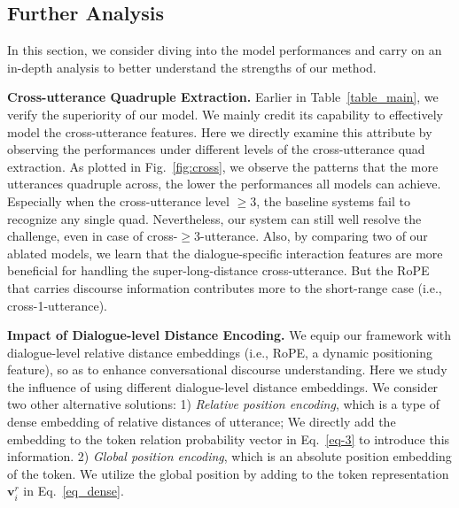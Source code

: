 \documentclass[11pt]{article}
\begin{document}
\vspace{-1mm}
\subsection{Further Analysis}

\vspace{-1mm}
In this section, we consider diving into the model performances and carry on an in-depth analysis to better understand the strengths of our method.

\vspace{2pt}
\noindent\textbf{Cross-utterance Quadruple Extraction.}
Earlier in Table~\ref{table_main}, we verify the superiority of our model.
We mainly credit its capability to effectively model the cross-utterance features.
Here we directly examine this attribute by observing the performances under different levels of the cross-utterance quad extraction.
As plotted in Fig.~\ref{fig:cross}, we observe the patterns that the more utterances quadruple across, the lower the performances all models can achieve.
Especially when the cross-utterance level $\ge$3, the baseline systems fail to recognize any single quad.
Nevertheless, our system can still well resolve the challenge, even in case of cross-$\ge$3-utterance.
Also, by comparing two of our ablated models, we learn that the dialogue-specific interaction features are more beneficial for handling the super-long-distance cross-utterance.
But the RoPE that carries discourse information contributes more to the short-range case (i.e., cross-1-utterance).

\vspace{2pt}
\noindent\textbf{Impact of Dialogue-level Distance Encoding.}
We equip our framework with dialogue-level relative distance embeddings (i.e., RoPE, a dynamic positioning feature), so as to enhance conversational discourse understanding.
Here we study the influence of using different dialogue-level distance embeddings.
We consider two other alternative solutions:
1) \emph{Relative position encoding}, which is a type of dense embedding of relative distances of utterance;
We directly add the embedding to the token relation probability vector in Eq.~\eqref{eq-3} to introduce this information. 
2) \emph{Global position encoding}, which is an absolute position embedding of the token. 
We utilize the global position by adding to the token representation $\bm{v}^r_i$ in Eq.~\eqref{eq_dense}.
\end{document}
